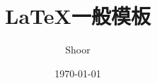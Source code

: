 \documentclass{article}
\title{\LaTeX 一般模板}
\author{Shoor}
\date{\today}
\begin{document}
\tableofcontents
\maketitle

\section{}
\end{document}
